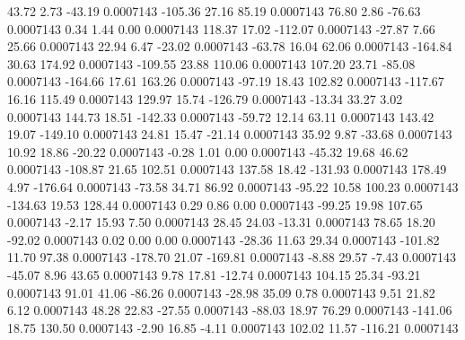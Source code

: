        43.72        2.73      -43.19     0.0007143
     -105.36       27.16       85.19     0.0007143
       76.80        2.86      -76.63     0.0007143
        0.34        1.44        0.00     0.0007143
      118.37       17.02     -112.07     0.0007143
      -27.87        7.66       25.66     0.0007143
       22.94        6.47      -23.02     0.0007143
      -63.78       16.04       62.06     0.0007143
     -164.84       30.63      174.92     0.0007143
     -109.55       23.88      110.06     0.0007143
      107.20       23.71      -85.08     0.0007143
     -164.66       17.61      163.26     0.0007143
      -97.19       18.43      102.82     0.0007143
     -117.67       16.16      115.49     0.0007143
      129.97       15.74     -126.79     0.0007143
      -13.34       33.27        3.02     0.0007143
      144.73       18.51     -142.33     0.0007143
      -59.72       12.14       63.11     0.0007143
      143.42       19.07     -149.10     0.0007143
       24.81       15.47      -21.14     0.0007143
       35.92        9.87      -33.68     0.0007143
       10.92       18.86      -20.22     0.0007143
       -0.28        1.01        0.00     0.0007143
      -45.32       19.68       46.62     0.0007143
     -108.87       21.65      102.51     0.0007143
      137.58       18.42     -131.93     0.0007143
      178.49        4.97     -176.64     0.0007143
      -73.58       34.71       86.92     0.0007143
      -95.22       10.58      100.23     0.0007143
     -134.63       19.53      128.44     0.0007143
        0.29        0.86        0.00     0.0007143
      -99.25       19.98      107.65     0.0007143
       -2.17       15.93        7.50     0.0007143
       28.45       24.03      -13.31     0.0007143
       78.65       18.20      -92.02     0.0007143
        0.02        0.00        0.00     0.0007143
      -28.36       11.63       29.34     0.0007143
     -101.82       11.70       97.38     0.0007143
     -178.70       21.07     -169.81     0.0007143
       -8.88       29.57       -7.43     0.0007143
      -45.07        8.96       43.65     0.0007143
        9.78       17.81      -12.74     0.0007143
      104.15       25.34      -93.21     0.0007143
       91.01       41.06      -86.26     0.0007143
      -28.98       35.09        0.78     0.0007143
        9.51       21.82        6.12     0.0007143
       48.28       22.83      -27.55     0.0007143
      -88.03       18.97       76.29     0.0007143
     -141.06       18.75      130.50     0.0007143
       -2.90       16.85       -4.11     0.0007143
      102.02       11.57     -116.21     0.0007143
